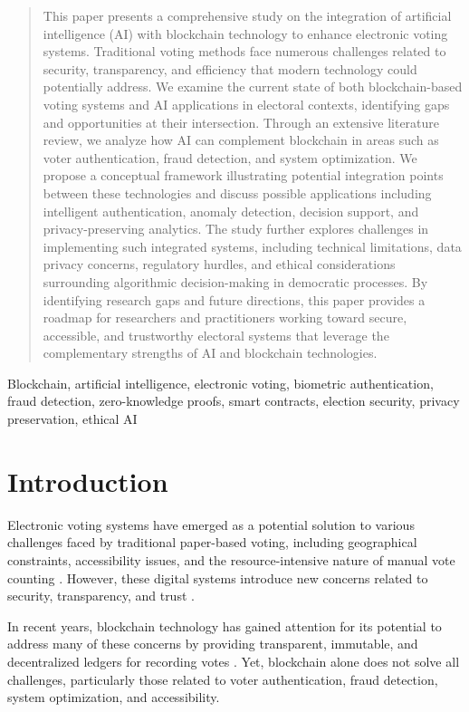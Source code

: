 \documentclass[conference]{IEEEtran}
\begin{document}
\begin{abstract}
This paper presents a comprehensive study on the integration of artificial intelligence (AI) with blockchain technology to enhance electronic voting systems. Traditional voting methods face numerous challenges related to security, transparency, and efficiency that modern technology could potentially address. We examine the current state of both blockchain-based voting systems and AI applications in electoral contexts, identifying gaps and opportunities at their intersection. Through an extensive literature review, we analyze how AI can complement blockchain in areas such as voter authentication, fraud detection, and system optimization. We propose a conceptual framework illustrating potential integration points between these technologies and discuss possible applications including intelligent authentication, anomaly detection, decision support, and privacy-preserving analytics. The study further explores challenges in implementing such integrated systems, including technical limitations, data privacy concerns, regulatory hurdles, and ethical considerations surrounding algorithmic decision-making in democratic processes. By identifying research gaps and future directions, this paper provides a roadmap for researchers and practitioners working toward secure, accessible, and trustworthy electoral systems that leverage the complementary strengths of AI and blockchain technologies.
\end{abstract}

\begin{IEEEkeywords}
Blockchain, artificial intelligence, electronic voting, biometric authentication, fraud detection, zero-knowledge proofs, smart contracts, election security, privacy preservation, ethical AI
\end{IEEEkeywords}

\section{Introduction}
Electronic voting systems have emerged as a potential solution to various challenges faced by traditional paper-based voting, including geographical constraints, accessibility issues, and the resource-intensive nature of manual vote counting \cite{b1}. However, these digital systems introduce new concerns related to security, transparency, and trust \cite{b2}. 

In recent years, blockchain technology has gained attention for its potential to address many of these concerns by providing transparent, immutable, and decentralized ledgers for recording votes \cite{b2}. Yet, blockchain alone does not solve all challenges, particularly those related to voter authentication, fraud detection, system optimization, and accessibility. 
\end{document}
